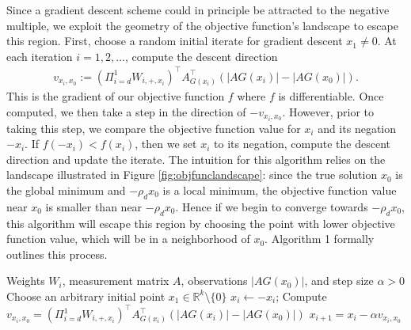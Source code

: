 \documentclass{article}
\begin{document}
Since a gradient descent scheme could in principle be attracted to the negative multiple, we exploit the geometry of the objective function's landscape to escape this region. First, choose a random initial iterate for gradient descent $x_1 \neq 0$. At each iteration $i = 1,2,\dots$, compute the descent direction \begin{align*}
v_{x_i,x_0} := (\Pi_{i=d}^1 W_{i,+,x_i})^\top A_{G(x_i)}^\top 
\left(|AG(x_i)| - |AG(x_0)|\right).
\end{align*} This is the gradient of our objective function $f$ where $f$ is differentiable. Once computed, we then take a step in the direction of $-v_{x_i,x_0}$. However, prior to taking this step, we compare the objective function value for $x_i$ and its negation $-x_i$. If $f(-x_i) < f(x_i)$, then we set $x_i$ to its negation, compute the descent direction and update the iterate. The intuition for this algorithm relies on the landscape illustrated in Figure \ref{fig:objfunclandscape}: since the true solution $x_0$ is the global minimum and $-\rho_d x_0$ is a local minimum, the objective function value near $x_0$ is smaller than near $-\rho_d x_0$. Hence if we begin to converge towards $-\rho_d x_0$, this algorithm will escape this region by choosing the point with lower objective function value, which will be in a neighborhood of $x_0$. Algorithm 1 formally outlines this process.

\begin{algorithm}
\caption{Deep Phase Retrieval (DPR) Gradient method}
\label{alg}
\begin{algorithmic}[1]
\REQUIRE Weights $W_i$, measurement matrix $A$, observations $|AG(x_0)|$, and step size $\alpha > 0$
\STATE Choose an arbitrary initial point $x_1 \in \mathbb{R}^k\setminus \{0\}$
  \label{alg:st3}
 \label{alg:cond1}
\STATE $x_{i} \gets - x_{i}$; \label{alg:cond2}
\ENDIF
\STATE Compute $v_{x_i,x_0} =(\Pi_{i=d}^1 W_{i,+,x_i})^\top A_{G(x_i)}^\top 
\left(|AG(x_i)| - |AG(x_0)|\right)$
\STATE $x_{i+1} = x_i - \alpha  v_{x_i,x_0}$
\ENDFOR
\end{algorithmic}
\end{algorithm}
\end{document}
